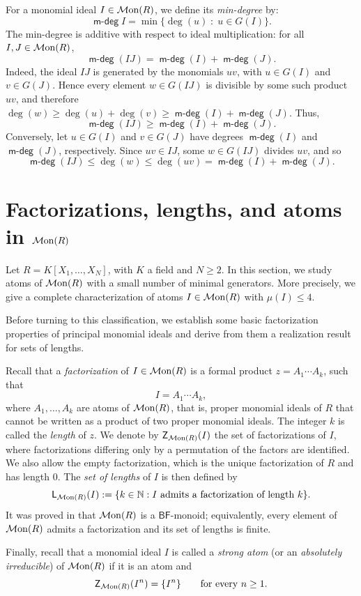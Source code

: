 \documentclass[a4paper,10pt,reqno]{amsart}
\theoremstyle{definition}
\theoremstyle{definition}
\providecommand\Mon{{\mathcal{M}{\rm on}}}
\DeclareMathOperator{\mdeg}{\mathsf {m-deg}}
\begin{document}
For a monomial ideal $I\in \Mon(R)$, we define its {\it min-degree} by:
\[\mdeg{I}=\min\{\deg(u) \; \colon \; u\in G(I)\}.\]
The min-degree is additive with respect to ideal multiplication: for all $I,J\in\Mon(R)$,
\[\mdeg(IJ)=\mdeg(I)+\mdeg(J).\]
Indeed, the ideal $IJ$ is generated by the monomials $uv$, with $u\in G(I)$ and $v\in G(J)$. Hence every element $w\in G(IJ)$ is divisible by some such product $uv$, and therefore $\deg(w)\geq \deg(u)+\deg(v)\geq \mdeg(I)+\mdeg(J)$. Thus,\[\mdeg(IJ)\geq \mdeg(I)+\mdeg(J).\]
Conversely, let $u\in G(I)$ and $v\in G(J)$ have degrees $\mdeg(I)$ and $\mdeg(J)$, respectively. Since $uv\in IJ$, some $w\in G(IJ)$ divides $uv$, and so
\[\mdeg(IJ)\leq \deg(w)\leq \deg(uv)=\mdeg(I)+\mdeg(J).\]

\section{Factorizations, lengths, and atoms in $\Mon(R)$}

Let $R=K[X_1,\ldots, X_N]$, with $K$ a field and $N\ge 2$. In this section, we study atoms of $\Mon(R)$ with a small number of minimal generators. More precisely, we give a complete characterization of atoms $I\in\Mon(R)$ with $\mu(I)\le 4$.

Before turning to this classification, we establish some basic factorization properties of principal monomial ideals and derive from them a realization result for sets of lengths. 

Recall that a \textit{factorization} of $I\in\Mon(R)$ is a formal product $z=A_1\cdots A_k$, such that \[I=A_1\cdots A_k,\]
where $A_1,\ldots,A_k$ are atoms of $\Mon(R)$, that is, proper monomial ideals of $R$ that cannot be written as a product of two proper monomial ideals. The integer $k$ is called the \textit{length} of $z$.
We denote by $\mathsf Z_{\Mon(R)}(I)$ the set of factorizations of $I$, where factorizations differing only by a permutation of the factors are identified. We also allow the empty factorization, which is the unique factorization of $R$ and has length $0$. The \textit{set of lengths} of $I$ is then defined by
\[
\mathsf L_{\Mon(R)}(I):=\{k\in\mathbb N : I \text{ admits a factorization of length } k\}.
\] 
It was proved in \cite[Theorem 4.7]{BCK} that $\Mon(R)$ is a $\mathsf{BF}$-monoid; equivalently, every element of $\Mon(R)$ admits a factorization and its set of lengths is finite.

Finally, recall that a monomial ideal $I$ is called a \textit{strong atom} (or an \textit{absolutely irreducible}) of $\Mon(R)$ if it is an atom and
\[\mathsf Z_{\Mon(R)}(I^n)=\{I^n\} \qquad\text{for every }n\ge 1.\]
\end{document}
